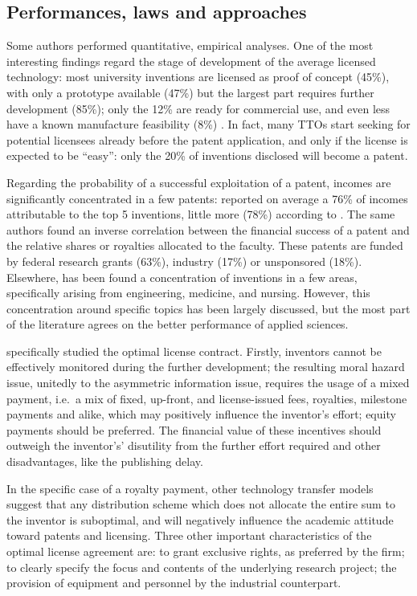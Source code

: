\subsection{Performances, laws and approaches}

Some authors performed quantitative, empirical analyses. One of the most interesting findings regard the stage of development of the average licensed technology: most university inventions are licensed as proof of concept (45\%), with only a prototype available (47\%) but the largest part requires further development (85\%); only the 12\% are ready for commercial use, and even less have a known manufacture feasibility (8\%) \citep{Thursby2002}. In fact, many TTOs start seeking for potential licensees already before the patent application, and only if the license is expected to be \enquote{easy}: only the 20\% of inventions disclosed will become a patent.

Regarding the probability of a successful exploitation of a patent, incomes are significantly concentrated in a few patents: \citet{Thursby2002} reported on average a 76\% of incomes attributable to the top 5 inventions, little more (78\%) according to \citet{Jensen2003}. The same authors found an inverse correlation between the financial success of a patent and the relative shares or royalties allocated to the faculty. These patents are funded by federal research grants (63\%), industry (17\%) or unsponsored (18\%). Elsewhere, has been found a concentration of inventions in a few areas, specifically arising from engineering, medicine, and nursing. However, this concentration around specific topics has been largely discussed, but the most part of the literature agrees on the better performance of applied sciences. 

\citet{Jensen2003} specifically studied the optimal license contract. Firstly, inventors cannot be effectively monitored during the further development; the resulting moral hazard issue, unitedly to the asymmetric information issue, requires the usage of a mixed payment, i.e.\ a mix of fixed, up-front, and license-issued fees, royalties, milestone payments and alike, which may positively influence the inventor's effort; equity payments should be preferred. The financial value of these incentives should outweigh the inventor's' disutility from the further effort required and other disadvantages, like the publishing delay. 

In the specific case of a royalty payment, other technology transfer models suggest that any distribution scheme which does not allocate the entire sum to the inventor is suboptimal, and will negatively influence the academic attitude toward patents and licensing. Three other important characteristics of the optimal license agreement are: to grant exclusive rights, as preferred by the firm; to clearly specify the focus and contents of the underlying research project; the provision of equipment and personnel by the industrial counterpart. 

